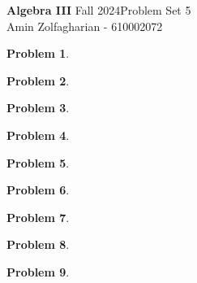 \documentclass[12pt]{article}
\newcommand{\customanswer}[1]{%
\begin{problem}
\end{problem}

}
\newtheorem{problem}{Problem}
\begin{document}
\noindent \textbf{Algebra III} Fall 2024\hfill Problem Set 5\\
Amin Zolfagharian - 610002072

\hrulefill

\customanswer{8}
\customanswer{9}
\customanswer{1}
\customanswer{3}
\customanswer{4}
\newpage
\customanswer{5}
\customanswer{6}
\customanswer{10}
\customanswer{7}
\end{document}
